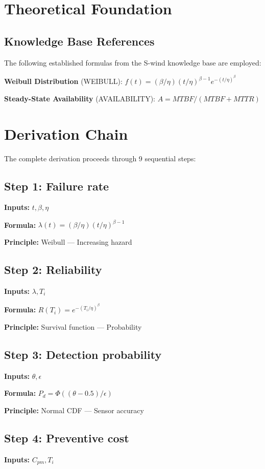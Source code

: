 \documentclass[11pt,twocolumn]{article}
\begin{document}
\section{Theoretical Foundation}

\subsection{Knowledge Base References}
The following established formulas from the S-wind knowledge base are employed:

\textbf{Weibull Distribution} (WEIBULL): $f(t) = (\beta/\eta)(t/\eta)^{\beta-1}e^{-(t/\eta)^\beta}$ \cite{Weibull}

\textbf{Steady-State Availability} (AVAILABILITY): $A = MTBF/(MTBF+MTTR)$ \cite{Reliability Engineering}


\section{Derivation Chain}

The complete derivation proceeds through 9 sequential steps:

\subsection*{Step 1: Failure rate}
\textbf{Inputs:} $t, \beta, \eta$

\textbf{Formula:} $\lambda(t) = (\beta/\eta)(t/\eta)^{\beta-1}$

\textbf{Principle:} Weibull --- Increasing hazard

\subsection*{Step 2: Reliability}
\textbf{Inputs:} $\lambda, T_i$

\textbf{Formula:} $R(T_i) = e^{-(T_i/\eta)^\beta}$

\textbf{Principle:} Survival function --- Probability

\subsection*{Step 3: Detection probability}
\textbf{Inputs:} $\theta, \epsilon$

\textbf{Formula:} $P_d = \Phi((\theta-0.5)/\epsilon)$

\textbf{Principle:} Normal CDF --- Sensor accuracy

\subsection*{Step 4: Preventive cost}
\textbf{Inputs:} $C_{pm}, T_i$
\end{document}
